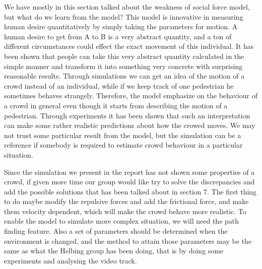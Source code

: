 We have mostly in this section talked about the weakness of social force 
model, but what do we learn from the model? This model is innovative in 
measuring human desire quantitatively by simply taking the parameters for motion. 
A human desire to get from A to B is a very abstract quantity, and a ton of
different circumstances could effect the exact movement of this
individual. It has been shown that people can take this very abstract quantity 
calculated in the simple manner and transform it into something very 
concrete with surprising reasonable results.
Through simulations we can get an idea of the motion of a crowd instead of an 
individual, while if we keep track of one pedestrian he sometimes behaves strangely. 
Therefore, the model emphasize on the behaviour of a crowd in general even though 
it starts from describing the motion of a pedestrian. Through experiments 
it has been shown that such an interpretation can make some rather realistic 
predictions about how the crowed moves. We may not trust some particular result from 
the model, but the simulation can be a reference if somebody is required to estimate 
crowd behaviour in a particular situation.

Since the simulation we present in the report has not shown some properties of a 
crowd, if given more time our group would like try to solve the discrepancies and add the 
possible solutions that has been talked about in section 7. The first thing to do 
maybe modify the repulsive forces and add the frictional force, and make them 
velocity dependent, which will make the crowd behave more realistic. 
To enable the model to simulate more complex situation, we will need the path 
finding feature. Also a set of parameters should be determined when the environment is 
changed, and the method to attain those parameters may be the same as what the 
Helbing group has been doing, that is by doing some experiments and analysing the 
 video track.